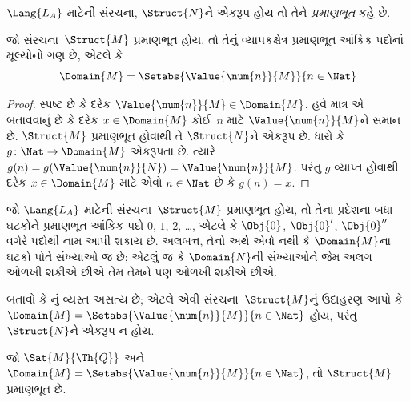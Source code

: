 \begin{defn}
$\Lang{L_A}$ માટેની સંરચના, $\Struct{N}$ને એકરૂપ હોય તો તેને
\emph{પ્રમાણભૂત} કહે છે.
\end{defn}

\begin{prop}
 જો સંરચના~$\Struct{M}$
પ્રમાણભૂત હોય, તો તેનું વ્યાપકક્ષેત્ર પ્રમાણભૂત આંકિક પદોનાં મૂલ્યોનો
ગણ છે, એટલે કે
\[
\Domain{M} = \Setabs{\Value{\num{n}}{M}}{n \in \Nat}
\]
\end{prop}

\begin{proof}
સ્પષ્ટ છે કે દરેક $\Value{\num{n}}{M}\in\Domain{M}$. હવે માત્ર એ
બતાવવાનું છે કે દરેક $x\in\Domain{M}$ કોઈ~$n$ માટે
$\Value{\num{n}}{M}$ને સમાન છે. $\Struct{M}$ પ્રમાણભૂત હોવાથી તે
$\Struct{N}$ને એકરૂપ છે. ધારો કે $g\colon\Nat\to\Domain{M}$ એકરૂપતા
છે. ત્યારે
$g(n)=g(\Value{\num{n}}{N})=\Value{\num{n}}{M}$. પરંતુ $g$
વ્યાપ્ત હોવાથી દરેક $x\in\Domain{M}$ માટે એવો $n\in\Nat$ છે
કે $g(n)=x$.
\end{proof}

\begin{explain}
જો $\Lang{L_A}$ માટેની સંરચના~$\Struct{M}$ પ્રમાણભૂત હોય, તો તેના
પ્રદેશના બધા ઘટકોને પ્રમાણભૂત આંકિક પદો $\num{0}$, $\num{1}$,
$\num{2}$, \dots, એટલે કે $\Obj{0}$, $\Obj{0}'$, $\Obj{0}''$ વગેરે
પદોથી નામ આપી શકાય છે. અલબત્ત, તેનો અર્થ એવો નથી કે
$\Domain{M}$ના ઘટકો પોતે સંખ્યાઓ જ છે; એટલું જ કે
$\Domain{N}$ની સંખ્યાઓને જેમ અલગ ઓળખી શકીએ છીએ તેમ તેમને પણ ઓળખી
શકીએ છીએ.
\end{explain}

\begin{prob}
બતાવો કે નું વ્યસ્ત અસત્ય છે;
એટલે એવી સંરચના~$\Struct{M}$નું ઉદાહરણ આપો કે
$\Domain{M}=\Setabs{\Value{\num{n}}{M}}{n\in\Nat}$ હોય, પરંતુ
$\Struct{N}$ને એકરૂપ ન હોય.
\end{prob}

\begin{prop}
જો $\Sat{M}{\Th{Q}}$ અને
$\Domain{M}=\Setabs{\Value{\num{n}}{M}}{n\in\Nat}$, તો
$\Struct{M}$ પ્રમાણભૂત છે.
\end{prop}

